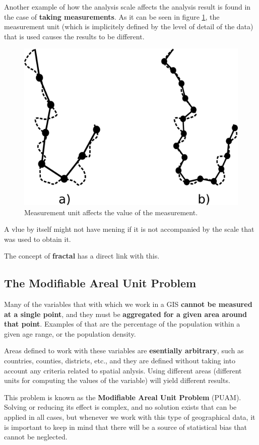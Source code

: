 Another example of how the analysis scale affects the analysis result is found in the case of \textbf{taking measurements}. As it can be seen in figure \ref{Fig:Fractal_line}, the measurement unit (which is implicitely defined by the level of detail of the data) that is used causes the results to be different. 

\begin{figure}[h]   
\centering
\includegraphics[width= .45\columnwidth]{Analysis/Fractal_line.pdf}
\caption{\small Measurement unit affects the value of the measurement.}
\label{Fig:Fractal_line} 
\end{figure}

A vlue by itself might not have mening if it is not accompanied by the scale that was used to obtain it.

The concept of \textbf{fractal} has a direct link with this.


\subsection{The Modifiable Areal Unit Problem}


Many of the variables that with which we work in a GIS \textbf{cannot be measured at a single point}, and they must be \textbf{aggregated for a given area around that point}. Examples of that are the percentage of the population within a given age range, or the population density. 

Areas defined to work with these variables are \textbf{esentially arbitrary}, such as countries, counties, districts, etc., and they are defined without taking into account any criteria related to spatial anlysis. Using different areas (different units for computing the values of the variable) will yield different results.

This problem is known as the \textbf{Modifiable Areal Unit Problem} (PUAM). Solving or reducing its effect is complex, and no solution exists that can be applied in all cases, but whenever we work with this type of geographical data, it is important to keep in mind that there will be a source of statistical bias that cannot be neglected.

